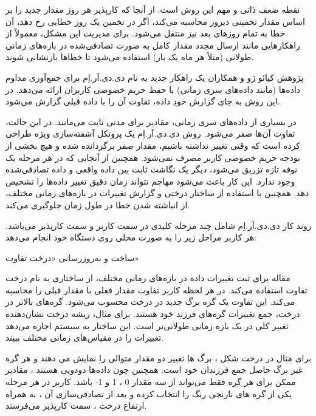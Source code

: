 نقطه ضعف ذاتی و مهم این روش  است. از آنجا که کارپذیر هر روز مقدار جدید را بر اساس مقدار تخمینی دیروز محاسبه می‌کند، اگر در تخمین یک روز خطایی رخ دهد، آن خطا به تمام روزهای بعد نیز منتقل می‌شود. برای مدیریت این مشکل، معمولاً از راهکارهایی مانند ارسال مجدد مقدار کامل به صورت تصادفی‌شده در بازه‌های زمانی طولانی (مثلاً هر ماه یک بار) استفاده می‌شود تا خطاها بازنشانی شوند.


پژوهش کیائو ژو و همکاران  یک راهکار جدید به نام دی.دی.آر.اِم برای جمع‌آوری مداوم داده‌ها (مانند داده‌های سری زمانی) با حفظ حریم خصوصی کاربران ارائه می‌دهد. در این روش به جای گزارش خودِ داده، تفاوت آن را با داده قبلی گزارش می‌شود.

در بسیاری از داده‌های سری زمانی، مقادیر برای مدتی ثابت می‌مانند. در این حالت، تفاوت آن‌ها صفر می‌شود. روش دی.دی.آر.اِم یک پروتکل آشفته‌سازی ویژه طراحی کرده است که وقتی تغییر نداشته باشیم، مقدار صفر برگردانده شده و هیچ بخشی از بودجه حریم خصوصی کاربر مصرف نمی‌شود. همچنین از آنجایی که در هر مرحله یک نوفه تازه تزریق می‌شود، دیگر یک نگاشت ثابت بین داده واقعی و داده تصادفی‌شده وجود ندارد. این کار باعث می‌شود مهاجم نتواند زمان دقیق تغییر داده‌ها را تشخیص دهد. همچنین با استفاده از ساختار درختی و گزارش تغییرات در بازه‌های زمانی مختلف، از انباشته شدن خطا در طول زمان جلوگیری می‌کند.



روند کار دی.دی.آر.اِم شامل چند مرحله کلیدی در سمت کاربر و سمت کارپذیر می‌باشد. هر کاربر مراحل زیر را به صورت محلی روی دستگاه خود انجام می‌دهد:


 ساخت و به‌روزرسانی «درخت تفاوت»

مقاله برای ثبت تغییرات داده در بازه‌های زمانی مختلف، از ساختاری به نام درخت تفاوت استفاده می‌کند. در هر لحظه کاربر تفاوت مقدار فعلی با مقدار قبلی را محاسبه می‌کند. این تفاوت یک گره برگ جدید در درخت محسوب می‌شود. گره‌های بالاتر در درخت، جمع تغییرات گره‌های فرزند خود هستند. برای مثال، ریشه درخت نشان‌دهنده تغییر کلی در یک بازه زمانی طولانی‌تر است. این ساختار به سیستم اجازه می‌دهد تغییرات را در مقیاس‌های زمانی مختلف ببیند.

برای مثال در درخت شکل  ، برگ ها تغییر دو مقدار متوالی را نمایش می دهند و هر گره غیر برگ حاصل جمع فرزندان خود است. همچنین چون داده‌ها دودویی هستند ، مقادیر ممکن برای هر گره فقط می‌تواند از سه مقدار 0 ، 1 و 1- باشد. کاربر در هر مرحله یکی از گره های نارنجی رنگ را انتخاب کرده و بعد از تصادفی‌سازی آن ، به همراه ارتفاع درخت ، سمت کارپذیر می‌فرستد.


